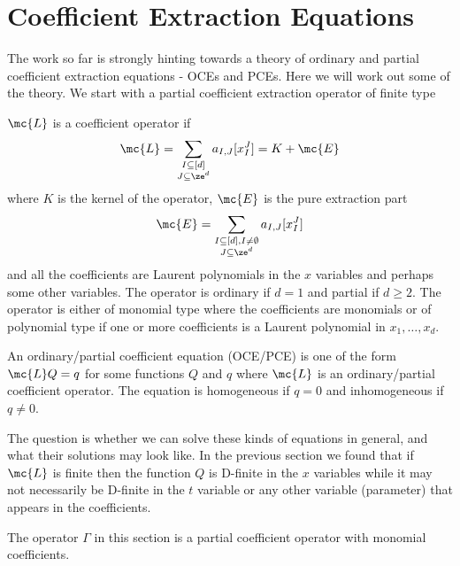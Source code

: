 \section{Coefficient Extraction Equations}

The work so far is strongly hinting towards a theory of ordinary and partial coefficient extraction equations - OCEs and PCEs. Here we will work out some of the theory. We start with a partial coefficient extraction operator of finite type
\begin{definition}$\mc{L}$ is a coefficient operator if
\begin{align}
	\mc{L} = \sum_{\substack{I\subseteq [d]\\ J \subseteq \ze^d}}a_{I,J}[x_I^J] = K + \mc{E}
\end{align}
where $K$ is the kernel of the operator, $\mc{E}$ is the pure extraction part
\begin{align}
	\mc{E}  = \sum_{\substack{I\subseteq [d],I\neq \emptyset\\ J \subseteq \ze^d}}a_{I,J}[x_I^J]
\end{align}
and all the coefficients are Laurent polynomials in the $x$ variables and perhaps some other variables. The operator is ordinary if $d = 1$ and partial if $d \ge 2$. The operator is either of monomial type where the coefficients are monomials or of polynomial type if one or more coefficients is a Laurent polynomial in $x_1,\ldots,x_d$.
\end{definition}
\begin{definition} An ordinary/partial coefficient equation (OCE/PCE) is one of the form $\mc{L} Q = q$ for some functions $Q$ and $q$ where $\mc{L}$ is an ordinary/partial coefficient operator. The equation is homogeneous if $q = 0$ and inhomogeneous if $q \neq 0$.
\end{definition}
The question is whether we can solve these kinds of equations in general, and what their solutions may look like. In the previous section we found that if $\mc{L}$ is finite then the function $Q$ is D-finite in the $x$ variables while it may not necessarily be D-finite in the $t$ variable or any other variable (parameter) that appears in the coefficients.

\begin{example} The operator $\Gamma$ in this section is a partial coefficient operator with monomial coefficients.
\end{example}

